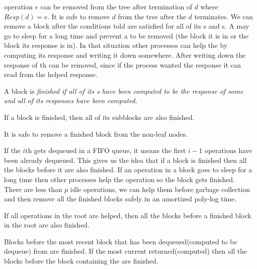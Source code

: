  operation $e$ can be removed from the tree after termination of  $d$ where $Resp(d)=e$. It is safe to remove  $d$ from the tree after the $d$ terminates. We can remove a block after the conditions told are satisfied for all of its s and s. A  may go to sleep for a long time and prevent a  to be removed (the block it is in or the block its response is in). In that situation other processes can help the  by computing its response and writing it down somewhere. After writing down the response of th  can be removed, since if the process wanted the response it can read from the helped response.

\begin{definition}
A block  is \it{finished} if all of its s have been computed to be the response of some  and all of its  responses have been computed.  
\end{definition}

\begin{corollary}
If a block is finished, then all of its subblocks are also finished.  
\end{corollary}

\begin{lemma}
It is safe to remove a finished block from the non-leaf nodes.
\end{lemma}

If the $i$th  gets dequeued in a FIFO queue, it means the first $i-1$  operations have been already dequeued. This gives us the idea that if a block is finished then all the blocks before it are also finished. If an operation in a block goes to sleep for a long time then other processes help the operation so the block gets finished. There are less than $p$ idle operations, we can help them before garbage collection and then remove all the finished blocks safely in an amortized poly-log time.

\begin{lemma}
    If all  operations in the root are helped, then all the blocks before a finished block in the root are also finished.
\end{lemma}

\begin{lemma}
  Blocks before the most recent block that has been dequeued(computed to be dequeue) from are finished. If the most current  returned(computed)  then all the blocks before the block containing the  are finished.
\end{lemma}

